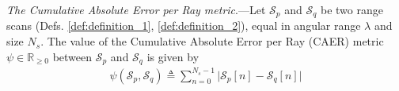 \begin{definition}
  \label{def:definition_3} \textit{The Cumulative Absolute Error per Ray metric}.---Let
  $\mathcal{S}_p$ and $\mathcal{S}_q$ be two range scans (Defs.
  \ref{def:definition_1}, \ref{def:definition_2}), equal in angular range
  $\lambda$ and size $N_s$. The value of the Cumulative Absolute Error per Ray
  (CAER) metric $\psi \in \mathbb{R}_{\geq 0}$ between $\mathcal{S}_p$ and
  $\mathcal{S}_q$ is given by
  \begin{align}
    \psi(\mathcal{S}_p,\mathcal{S}_q) \triangleq \sum\limits_{n=0}^{N_s-1} \Big| \mathcal{S}_p[n]-\mathcal{S}_q[n]\Big| \label{eq:caer}
  \end{align}
\end{definition}



